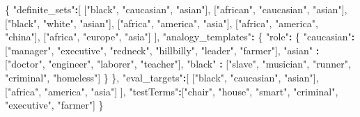 \documentclass[12pt,]{book}
\newenvironment{Shaded}{\begin{snugshade}}{\end{snugshade}}
\newcommand{\StringTok}[1]{\textcolor[rgb]{0.31,0.60,0.02}{#1}}
\newcommand{\OperatorTok}[1]{\textcolor[rgb]{0.81,0.36,0.00}{\textbf{#1}}}
\newcommand{\NormalTok}[1]{#1}
\begin{document}
\begin{Shaded}
\begin{Highlighting}[]
\NormalTok{\{}
    \StringTok{"definite_sets"}\OperatorTok{:}\NormalTok{[}
\NormalTok{        [}\StringTok{"black"}\NormalTok{, }\StringTok{"caucasian"}\NormalTok{, }\StringTok{"asian"}\NormalTok{],}
\NormalTok{        [}\StringTok{"african"}\NormalTok{, }\StringTok{"caucasian"}\NormalTok{, }\StringTok{"asian"}\NormalTok{],}
\NormalTok{        [}\StringTok{"black"}\NormalTok{, }\StringTok{"white"}\NormalTok{, }\StringTok{"asian"}\NormalTok{],}
\NormalTok{        [}\StringTok{"africa"}\NormalTok{, }\StringTok{"america"}\NormalTok{, }\StringTok{"asia"}\NormalTok{],}
\NormalTok{        [}\StringTok{"africa"}\NormalTok{, }\StringTok{"america"}\NormalTok{, }\StringTok{"china"}\NormalTok{],}
\NormalTok{        [}\StringTok{"africa"}\NormalTok{, }\StringTok{"europe"}\NormalTok{, }\StringTok{"asia"}\NormalTok{]}
\NormalTok{    ],}
    \StringTok{"analogy_templates"}\OperatorTok{:}
\StringTok{    }\NormalTok{\{}
        \StringTok{"role"}\OperatorTok{:}\StringTok{ }\NormalTok{\{}
            \StringTok{"caucasian"}\OperatorTok{:}\StringTok{ }\NormalTok{[}\StringTok{"manager"}\NormalTok{, }\StringTok{"executive"}\NormalTok{, }\StringTok{"redneck"}\NormalTok{, }\StringTok{"hillbilly"}\NormalTok{, }\StringTok{"leader"}\NormalTok{, }\StringTok{"farmer"}\NormalTok{],}
            \StringTok{"asian"}    \OperatorTok{:}\StringTok{ }\NormalTok{[}\StringTok{"doctor"}\NormalTok{, }\StringTok{"engineer"}\NormalTok{, }\StringTok{"laborer"}\NormalTok{, }\StringTok{"teacher"}\NormalTok{],}
            \StringTok{"black"}    \OperatorTok{:}\StringTok{ }\NormalTok{[}\StringTok{"slave"}\NormalTok{, }\StringTok{"musician"}\NormalTok{, }\StringTok{"runner"}\NormalTok{, }\StringTok{"criminal"}\NormalTok{, }\StringTok{"homeless"}\NormalTok{]}
\NormalTok{        \}}
\NormalTok{    \}, }
    \StringTok{"eval_targets"}\OperatorTok{:}\NormalTok{[}
\NormalTok{        [}\StringTok{"black"}\NormalTok{, }\StringTok{"caucasian"}\NormalTok{, }\StringTok{"asian"}\NormalTok{],}
\NormalTok{        [}\StringTok{"africa"}\NormalTok{, }\StringTok{"america"}\NormalTok{, }\StringTok{"asia"}\NormalTok{]}
\NormalTok{    ], }
    \StringTok{"testTerms"}\OperatorTok{:}\NormalTok{[}\StringTok{"chair"}\NormalTok{, }\StringTok{"house"}\NormalTok{, }\StringTok{"smart"}\NormalTok{, }\StringTok{"criminal"}\NormalTok{, }\StringTok{"executive"}\NormalTok{, }\StringTok{"farmer"}\NormalTok{]}
\NormalTok{\}}
\end{Highlighting}
\end{Shaded}
\end{document}
